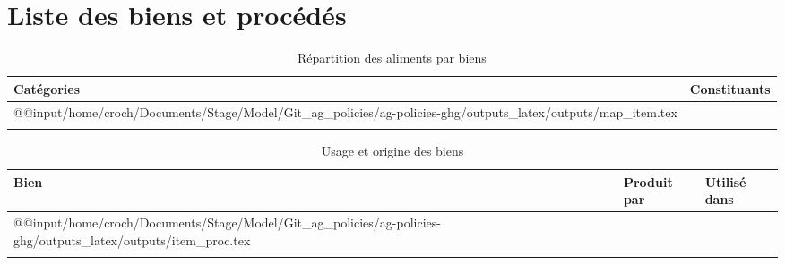 \section{Liste des biens et procédés}\label{annexe:item_pord}

\begin{longtable}[h]{p{1.5in}p{4.5in}}
    \textbf{Catégories} & \textbf{Constituants} \\         \hline
    \endfirsthead
    \endhead
    \csname @@input\endcsname /home/croch/Documents/Stage/Model/Git_ag_policies/ag-policies-ghg/outputs_latex/outputs/map_item.tex
    \hline                                      \\
    \caption{Répartition des aliments par biens}
\end{longtable}

\begin{longtable}[h]{p{1.5in}p{2.5in}p{1.8in}}
    \textbf{Bien} & \textbf{Produit par} & \textbf{Utilisé dans} \\         \hline
    \endfirsthead
    \endhead
    \csname @@input\endcsname /home/croch/Documents/Stage/Model/Git_ag_policies/ag-policies-ghg/outputs_latex/outputs/item_proc.tex
    \hline                                                       \\
    \caption{Usage et origine des biens}
\end{longtable}


